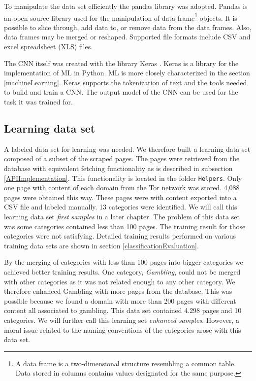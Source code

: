 To manipulate the data set efficiently the pandas library \cite{pandas} was adopted. Pandas is an open-source library used for the manipulation of data frame\footnote{A data frame is a two-dimensional structure resembling a common table. Data stored in columns contains values designated for the same purpose. } objects. It is possible to slice through, add data to, or remove data from the data frames. Also, data frames may be merged or reshaped. Supported file formats include CSV and excel spreadsheet (XLS) files.

The CNN itself was created with the library Keras \cite{keras}. Keras is a library for the implementation of ML in Python. ML is more closely characterized in the section \ref{machineLearning}. Keras supports the tokenization of text and the tools needed to build and train a CNN. The output model of the CNN can be used for the task it was trained for.

\subsection{Learning data set} \label{LearningDatasetImplementation}
A labeled data set for learning was needed. We therefore built a learning data set composed of a subset of the scraped pages. The pages were retrieved from the database with equivalent fetching functionality as is described in subsection \ref{APIImplementation}. This functionality is located in the folder \texttt{Helpers}. Only one page with content of each domain from the Tor network was stored. 4,088 pages were obtained this way. These pages were with content exported into a CSV file and labeled manually. 13 categories were identified. We will call this learning data set \textit{first samples} in a later chapter. The problem of this data set was some categories contained less than 100 pages. The training result for those categories were not satisfying. Detailed training results performed on various training data sets are shown in section \ref{classificationEvaluation}. 

By the merging of categories with less than 100 pages into bigger categories we achieved better training results. One category, \textit{Gambling}, could not be merged with other categories as it was not related enough to any other category. We therefore enhanced Gambling with more pages from the database. This was possible because we found a domain with more than 200 pages with different content all associated to gambling. This data set contained 4.298 pages and 10 categories. We will further call this learning set \textit{enhanced samples}. However, a moral issue related to the naming conventions of the categories arose with this data set. 

